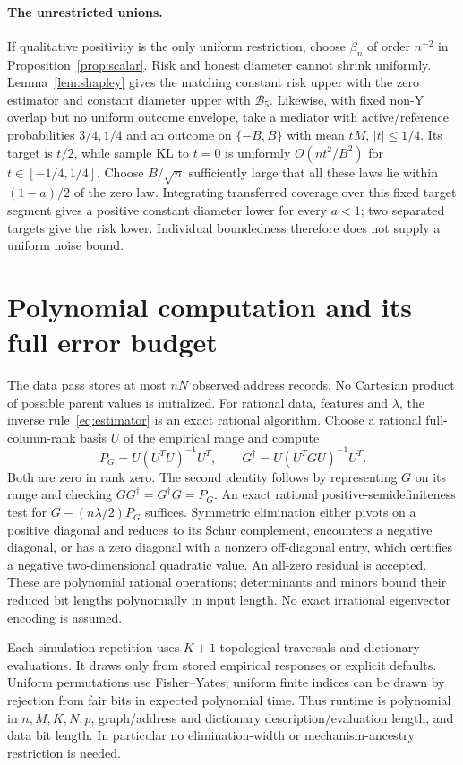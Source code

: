 \documentclass[11pt,a4paper]{article}
\numberwithin{equation}{section}
\theoremstyle{definition}
\begin{document}
\paragraph{The unrestricted unions.}
If qualitative positivity is the only uniform restriction, choose
$\beta_n$ of order $n^{-2}$ in Proposition~\ref{prop:scalar}. Risk and
honest diameter cannot shrink uniformly. Lemma~\ref{lem:shapley} gives
the matching constant risk upper with the zero estimator and constant
diameter upper with $\mathcal B_5$. Likewise, with fixed non-Y overlap
but no uniform outcome envelope, take a mediator with active/reference
probabilities $3/4,1/4$ and an outcome on $\{-B,B\}$ with mean $tM$,
$|t|\le1/4$. Its target is $t/2$, while sample KL to $t=0$ is uniformly
$O(nt^2/B^2)$ for $t\in[-1/4,1/4]$. Choose $B/\sqrt n$ sufficiently
large that all these laws lie within $(1-a)/2$ of the zero law.
Integrating transferred coverage over this fixed target segment gives
a positive constant diameter lower for every $a<1$; two separated
targets give the risk lower. Individual boundedness therefore
does not supply a uniform noise bound.

\section{Polynomial computation and its full error budget}\label{sec:computation}

The data pass stores at most $nN$ observed address records. No Cartesian
product of possible parent values is initialized. For rational data,
features and $\lambda$, the inverse rule~\eqref{eq:estimator} is an
exact rational algorithm. Choose a rational full-column-rank basis $U$
of the empirical range and compute
\[
 P_G=U(U^TU)^{-1}U^T,\qquad
 G^\dagger=U(U^TGU)^{-1}U^T.
\]
Both are zero in rank zero. The second identity follows by representing
$G$ on its range and checking $GG^\dagger=G^\dagger G=P_G$.
An exact rational positive-semidefiniteness test for
$G-(n\lambda/2)P_G$ suffices. Symmetric elimination either pivots on a
positive diagonal and reduces to its Schur complement, encounters a
negative diagonal, or has a zero diagonal with a nonzero off-diagonal
entry, which certifies a negative two-dimensional quadratic value.
An all-zero residual is accepted. These are polynomial rational
operations; determinants and minors bound their reduced bit lengths
polynomially in input length. No exact irrational eigenvector encoding
is assumed.

Each simulation repetition uses $K+1$ topological traversals and dictionary
evaluations. It draws only from stored empirical responses or explicit
defaults. Uniform permutations use Fisher--Yates; uniform finite indices
can be drawn by rejection from fair bits in expected polynomial time.
Thus runtime is polynomial in $n,M,K,N,p$, graph/address and dictionary
description/evaluation length, and data bit length. In particular no
elimination-width or mechanism-ancestry restriction is needed.
\end{document}

